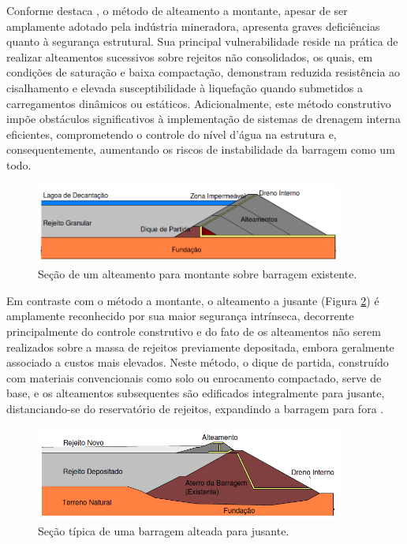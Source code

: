 Conforme destaca , o método de alteamento a montante, apesar de ser amplamente adotado pela indústria mineradora, apresenta graves deficiências quanto à segurança estrutural. Sua principal vulnerabilidade reside na prática de realizar alteamentos sucessivos sobre rejeitos não consolidados, os quais, em condições de saturação e baixa compactação, demonstram reduzida resistência ao cisalhamento e elevada susceptibilidade à liquefação quando submetidos a carregamentos dinâmicos ou estáticos. Adicionalmente, este método construtivo impõe obstáculos significativos à implementação de sistemas de drenagem interna eficientes, comprometendo o controle do nível d'água na estrutura e, consequentemente, aumentando os riscos de instabilidade da barragem como um todo.

\begin{figure}[!htb]
    \centering
    \includegraphics[width=0.9\textwidth]{figures/image19_jusante.png}
    \caption{Seção de um alteamento para montante sobre barragem existente.}
    \label{fig:metodo_montante_barragem_existente}
\end{figure}


Em contraste com o método a montante, o alteamento a jusante (Figura \ref{fig:metodo_jusante}) é amplamente reconhecido por sua maior segurança intrínseca, decorrente principalmente do controle construtivo e do fato de os alteamentos não serem realizados sobre a massa de rejeitos previamente depositada, embora geralmente associado a custos mais elevados. Neste método, o dique de partida, construído com materiais convencionais como solo ou enrocamento compactado, serve de base, e os alteamentos subsequentes são edificados integralmente para jusante, distanciando-se do reservatório de rejeitos, expandindo a barragem para fora \cite{ibram2016, ctsufsj2017}.

\begin{figure}[!htb]
    \centering
    \includegraphics[width=0.9\textwidth]{figures/image18_montante_cont.png}
    \caption{Seção típica de uma barragem alteada para jusante.}
    \label{fig:metodo_jusante}
\end{figure}

